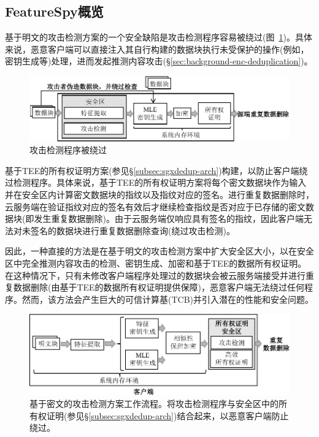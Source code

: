 \subsection{FeatureSpy概览}
\label{subsec:featurespy-secure_design}

基于明文的攻击检测方案的一个安全缺陷是攻击检测程序容易被绕过(图~\ref{fig:featurespy-architecture-strawman-bypass})。具体来说，恶意客户端可以直接注入其自行构建的数据块执行未受保护的操作(例如，密钥生成等)处理，进而发起推测内容攻击(\S\ref{sec:background-enc-deduplication})。

\begin{figure}[!htb]
  \centering
  \includegraphics[width=\textwidth]{pic/featurespy/naive-problem.pdf}
  \caption{攻击检测程序被绕过}
  \label{fig:featurespy-architecture-strawman-bypass}
\end{figure}


\sysnameF 基于TEE的所有权证明方案(参见\S\ref{subsec:sgxdedup-arch})构建，以防止客户端绕过检测程序。具体来说，基于TEE的所有权证明方案将每个密文数据块作为输入并在安全区内计算密文数据块的指纹以及指纹对应的签名。进行重复数据删除时，云服务端在验证指纹对应的签名有效后才继续检查指纹是否对应于已存储的密文数据块(即发生重复数据删除)。由于云服务端仅响应具有签名的指纹，因此客户端无法对未签名的数据块进行重复数据删除查询(绕过攻击检测)。

因此，一种直接的方法是在基于明文的攻击检测方案中扩大安全区大小，以在安全区中完全推测内容攻击的检测、密钥生成、加密和基于TEE的数据所有权证明。在这种情况下，只有未修改客户端程序处理过的数据块会被云服务端接受并进行重复数据删除(由基于TEE的数据所有权证明提供保障)，恶意客户端无法绕过任何程序。然而，该方法会产生巨大的可信计算基(TCB)并引入潜在的性能和安全问题。

\begin{figure}[!htb]
  \centering
  \includegraphics[width=\textwidth]{pic/featurespy/architecture.pdf}
  \caption{基于密文的攻击检测方案工作流程。\sysnameF 将攻击检测程序与安全区中的所有权证明(参见\S\ref{subsec:sgxdedup-arch})结合起来，以恶意客户端防止绕过。}
  \label{fig:featurespy-architecture-secure}
\end{figure}

